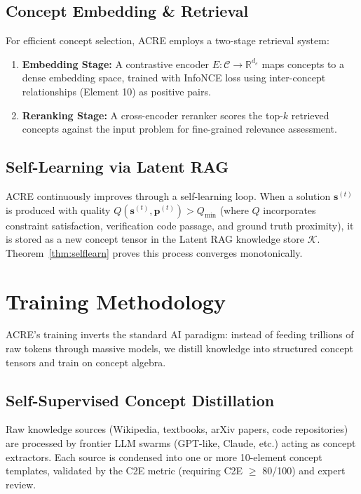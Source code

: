 \documentclass{article}
\newcommand{\R}{\mathbb{R}}
\newcommand{\cC}{\mathcal{C}}
\newcommand{\cK}{\mathcal{K}}
\newcommand{\bp}{\mathbf{p}}
\newcommand{\bs}{\mathbf{s}}
\begin{document}
\subsection{Concept Embedding \& Retrieval}

For efficient concept selection, ACRE employs a two-stage retrieval system:
\begin{enumerate}[leftmargin=*]
    \item \textbf{Embedding Stage:} A contrastive encoder $E: \cC \to \R^{d_e}$ maps concepts to a dense embedding space, trained with InfoNCE loss using inter-concept relationships (Element 10) as positive pairs.
    \item \textbf{Reranking Stage:} A cross-encoder reranker scores the top-$k$ retrieved concepts against the input problem for fine-grained relevance assessment.
\end{enumerate}

\subsection{Self-Learning via Latent RAG}

ACRE continuously improves through a self-learning loop. When a solution $\bs^{(t)}$ is produced with quality $Q(\bs^{(t)}, \bp^{(t)}) > Q_{\min}$ (where $Q$ incorporates constraint satisfaction, verification code passage, and ground truth proximity), it is stored as a new concept tensor in the Latent RAG knowledge store $\cK$. Theorem~\ref{thm:selflearn} proves this process converges monotonically.

\section{Training Methodology}

ACRE's training inverts the standard AI paradigm: instead of feeding trillions of raw tokens through massive models, we distill knowledge into structured concept tensors and train on concept algebra.

\subsection{Self-Supervised Concept Distillation}

Raw knowledge sources (Wikipedia, textbooks, arXiv papers, code repositories) are processed by frontier LLM swarms (GPT-like, Claude, etc.) acting as concept extractors. Each source is condensed into one or more 10-element concept templates, validated by the C2E metric \citep{4qdr2026c2e} (requiring C2E $\geq$ 80/100) and expert review.
\end{document}
